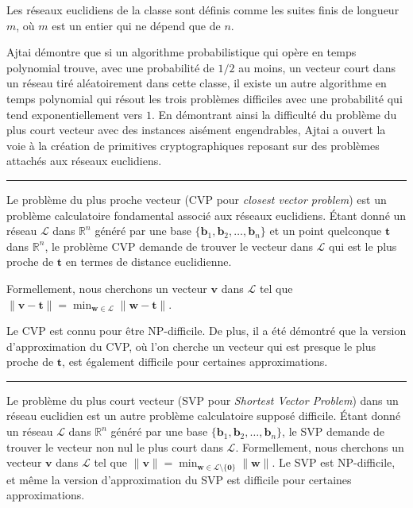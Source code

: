 Les réseaux euclidiens de la classe sont définis comme les suites finis de longueur $m$, où $m$ est un entier qui ne dépend que de $n$.

Ajtai démontre que si un algorithme probabilistique qui opère en temps polynomial trouve, avec une
probabilité de $1/2$ au moins, un vecteur court dans un réseau tiré aléatoirement dans cette classe,
il existe un autre algorithme en temps polynomial qui résout les trois problèmes difficiles avec une
probabilité qui tend exponentiellement vers $1$.
En démontrant ainsi la difficulté du problème du plus court vecteur avec des instances aisément
engendrables, Ajtai a ouvert la voie à la création de primitives cryptographiques reposant sur des
problèmes attachés aux réseaux euclidiens.





\vskip1cm
\hrule
\vskip1cm
Le problème du plus proche vecteur (CVP pour \emph{closest vector problem}) est un problème calculatoire fondamental associé aux réseaux euclidiens. Étant donné un réseau $\mathcal{L}$ dans $\mathbb{R}^n$ généré par une base $\{\mathbf{b}_1, \mathbf{b}_2, \ldots, \mathbf{b}_n\}$ et un point quelconque $\mathbf{t}$ dans $\mathbb{R}^n$, le problème CVP demande de trouver le vecteur dans $\mathcal{L}$ qui est le plus proche de $\mathbf{t}$ en termes de distance euclidienne.

Formellement, nous cherchons un vecteur $\mathbf{v}$ dans $\mathcal{L}$ tel que $\|\mathbf{v}-\mathbf{t}\| = \min_{\mathbf{w} \in \mathcal{L}} \|\mathbf{w}-\mathbf{t}\|$.

Le CVP est connu pour être NP-difficile. De plus, il a été démontré que la version d'approximation du CVP, où l'on cherche un vecteur qui est presque le plus proche de $\mathbf{t}$, est également difficile pour certaines approximations. 

\vskip1cm
\hrule
\vskip1cm


Le problème du plus court vecteur (SVP pour \emph{Shortest Vector Problem}) dans un réseau euclidien est un autre problème calculatoire supposé difficile. Étant donné un réseau $\mathcal{L}$ dans $\mathbb{R}^n$ généré par une base $\{\mathbf{b}_1, \mathbf{b}_2, \ldots, \mathbf{b}_n\}$, le SVP demande de trouver le vecteur non nul le plus court dans $\mathcal{L}$. Formellement, nous cherchons un vecteur $\mathbf{v}$ dans $\mathcal{L}$ tel que $\|\mathbf{v}\| = \min_{\mathbf{w} \in \mathcal{L} \setminus \{ \mathbf{0} \}} \|\mathbf{w}\|$. Le SVP est NP-difficile, et même la version d'approximation du SVP est difficile pour certaines approximations.

